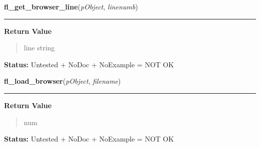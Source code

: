\hspace{.8\funcindent}\begin{boxedminipage}{\funcwidth}

    \raggedright \textbf{fl\_get\_browser\_line}(\textit{pObject}, \textit{linenumb})

    \vspace{-1.5ex}

    \rule{\textwidth}{0.5\fboxrule}
\setlength{\parskip}{2ex}
\setlength{\parskip}{1ex}
      \textbf{Return Value}
    \vspace{-1ex}

      \begin{quote}
      line string

      \end{quote}

\textbf{Status:} Untested + NoDoc + NoExample = NOT OK



    \end{boxedminipage}

    \label{xformslib:library:fl_load_browser}

    \vspace{0.5ex}

\hspace{.8\funcindent}\begin{boxedminipage}{\funcwidth}

    \raggedright \textbf{fl\_load\_browser}(\textit{pObject}, \textit{filename})

    \vspace{-1.5ex}

    \rule{\textwidth}{0.5\fboxrule}
\setlength{\parskip}{2ex}
\setlength{\parskip}{1ex}
      \textbf{Return Value}
    \vspace{-1ex}

      \begin{quote}
      num

      \end{quote}

\textbf{Status:} Untested + NoDoc + NoExample = NOT OK



    \end{boxedminipage}

    \label{xformslib:library:fl_select_browser_line}

